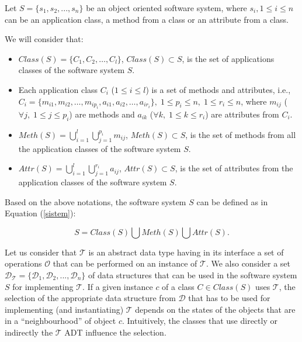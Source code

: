 Let $S=\{s_1, s_2, ..., s_n\}$ be an object oriented software system, where $s_i, 1 \le i \le n$ can be an application class, a method from a class or an attribute from a class.

We will consider that:

\begin{itemize}

\item $Class(S)=\{C_{1}, C_{2}, \dots , C_{l}\}$, $Class(S) \subset S$, is the set of applications classes of the software system $S$. 

\item Each application class $C_i$ ($1 \le i \le l$) is a set of methods and attributes, i.e., $C_i=\{m_{i1}, m_{i2}, \dots , m_{ip_{i}}, a_{i1}, a_{i2}, \dots , a_{ir_{i}} \}, \; 1 \le p_i \le n, \; 1 \le r_i \le n$, where $m_{ij}$ ($\forall j,\; 1 \le j \le p_i$) are methods  and $a_{ik}$ ($\forall k, \; 1 \le k \le r_i$) are attributes from $C_i$.

\item $Meth(S)= \displaystyle\bigcup_{i=1}^{l}\displaystyle\bigcup_{j=1}^{p_i}{m_{ij}}$, $Meth(S) \subset S$, is the set of methods from all the application classes of the software system $S$.

\item $Attr(S)= \displaystyle\bigcup_{i=1}^{l}\displaystyle\bigcup_{j=1}^{r_i}{a_{ij}}$, $Attr(S) \subset S$, is the set of attributes from the application classes of the software system $S$.

\end{itemize}

Based on the above notations, the software system $S$ can be defined as in Equation (\ref{sistem}):

\begin{equation}\label{sistem}
S=Class(S)\bigcup Meth(S) \bigcup Attr(S).
\end{equation}

Let us consider that $\mathcal{T}$ is an abstract data type having in its interface a set of operations $\mathcal{O}$ that can be performed on an instance of $\mathcal{T}$. We also consider a set $\mathcal{D}_\mathcal{T}=\{\mathcal{D}_1, \mathcal{D}_2, ... , \mathcal{D}_n\}$ of data structures that can be  used in the software system $S$ for implementing $\mathcal{T}$. If a given instance $c$ of a class $C \in Class(S)$ uses  $\mathcal{T}$, the selection of the appropriate data structure from $\mathcal{D}$ that has to be used for implementing (and instantiating) $\mathcal{T}$ depends on the states of the objects that are in a ``neighbourhood'' of object $c$. Intuitively, the classes that use directly or indirectly the $\mathcal{T}$ ADT influence the selection. 


